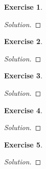 \documentclass[12pt,a4]{article}
\theoremstyle{definition}
\newtheorem{exercise}{Exercise}
\begin{document}
\begin{exercise}
	
\end{exercise}
\begin{proof}[Solution]
	
\end{proof}

\begin{exercise}
	
\end{exercise}
\begin{proof}[Solution]
	
\end{proof}

\begin{exercise}
	
\end{exercise}
\begin{proof}[Solution]
	
\end{proof}

\begin{exercise}
	
\end{exercise}
\begin{proof}[Solution]
	
\end{proof}

\begin{exercise}
	
\end{exercise}
\begin{proof}[Solution]
	
\end{proof}
\end{document}
